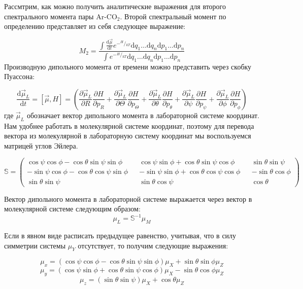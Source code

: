 

Рассмтрим, как можно получить аналитические выражения для второго спектрального момента пары Ar-$\mathrm{CO_2}$.
Второй спектральный момент по определению представляет из себя следующее выражение:

\[
M_2 = \frac{\int \frac{\mathrm{d}\vec\mu}{\mathrm{d} t} e^{-{}^H/ \! {}_{kT}} \mathrm{d}q_1 \ldots \mathrm{d}q_n \mathrm{d}p_1 \ldots \mathrm{d}p_n}{\int e^{-{}^H/ \! {}_{kT}} \mathrm{d}q_1 \ldots \mathrm{d}q_n \mathrm{d}p_1 \ldots \mathrm{d}p_n}
\]
Производную дипольного момента от времени можно представить через скобку Пуассона:

\[
\frac{\mathrm{d}\vec\mu_L}{\mathrm{d} t} = [\vec\mu , H] = \left( \frac{\partial \vec\mu_{L}}{\partial R}\frac{\partial H}{\partial p_R}     + 
\frac{\partial \vec\mu_{L}}{\partial \Theta}\frac{\partial H}{\partial p_{\Theta}} +
\frac{\partial \vec\mu_{L}}{\partial \theta}\frac{\partial H}{\partial p_{\theta}} +
\frac{\partial \vec\mu_{L}}{\partial \psi}\frac{\partial H}{\partial p_{\psi}}  +
\frac{\partial \vec\mu_{L}}{\partial \phi}\frac{\partial H}{\partial p_{\phi}} \right)
\]
где $\vec\mu_L$ обозначает вектор дипольного момента в лабораторной системе координат. Нам удобнее работать в молекулярной системе координат, поэтому для перевода вектора из молекулярной в лабораторную систему координат мы воспользуемся матрицей углов Эйлера.


\[
\mathbb{S} = \left( \begin{matrix} \cos \psi \cos \phi - \cos \theta \sin \psi \sin \phi &&  \cos \psi \sin \phi + \cos \theta \sin \psi \cos \phi && \sin \theta \sin \psi \\
- \sin \psi \cos \phi - \cos \theta \cos \psi \sin \phi && - \sin \psi \sin \phi + \cos \theta \cos \psi \cos \phi && -\sin \theta \cos \phi \\
\sin \theta \sin \psi && \sin \theta \cos \psi && \cos \theta    \end{matrix} \right)
\]

Вектор дипольного момента в лабораторной системе выражается через вектор в молекулярной системе следующим образом:
\[
\mu_{L} = \mathbb{S}^{-1} \mu_{M}
\]

Если в явном виде расписать предыдущее равенство, учитывая, что в силу симметрии системы $\mu_Y$ отсутствует, то получим следующие выражения:

\[
\mu_x = (\cos \psi \cos \phi - \cos \theta \sin \psi \sin \phi)\mu_X + \sin \theta \sin \phi \mu_Z
\]
\[
\mu_y = (\cos \psi \sin \phi + \cos \theta \sin \psi \cos \phi)\mu_X - \sin \theta \cos \phi \mu_Z
\]
\[
\mu_z =( \sin\theta\sin\psi)\mu_X + \cos\theta \mu_Z
\]

